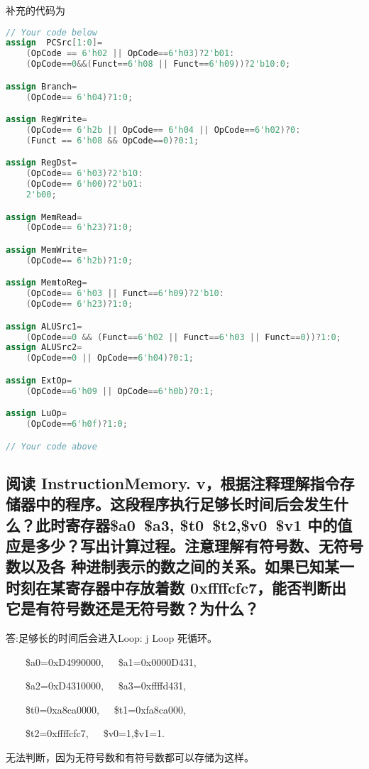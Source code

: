 \documentclass{ctexart}
\begin{document}
        补充的代码为
        	\begin{lstlisting}[language=verilog]
// Your code below
assign 	PCSrc[1:0]=
    (OpCode == 6'h02 || OpCode==6'h03)?2'b01:
    (OpCode==0&&(Funct==6'h08 || Funct==6'h09))?2'b10:0;

assign Branch=
    (OpCode== 6'h04)?1:0;

assign RegWrite=
    (OpCode== 6'h2b || OpCode== 6'h04 || OpCode==6'h02)?0:
    (Funct == 6'h08 && OpCode==0)?0:1;

assign RegDst=
    (OpCode== 6'h03)?2'b10:
    (OpCode== 6'h00)?2'b01:
    2'b00;

assign MemRead=
    (OpCode== 6'h23)?1:0;

assign MemWrite=
    (OpCode== 6'h2b)?1:0;

assign MemtoReg=
    (OpCode== 6'h03 || Funct==6'h09)?2'b10:
    (OpCode== 6'h23)?1:0;

assign ALUSrc1=
    (OpCode==0 && (Funct==6'h02 || Funct==6'h03 || Funct==0))?1:0;
assign ALUSrc2=
    (OpCode==0 || OpCode==6'h04)?0:1;

assign ExtOp=
    (OpCode==6'h09 || OpCode==6'h0b)?0:1;

assign LuOp=
    (OpCode==6'h0f)?1:0;

// Your code above
    \end{lstlisting}
        \subsection{ 阅读 InstructionMemory.   
        v，根据注释理解指令存储器中的程序。这段程序执行足够长时间后会发生什么？此时寄存器\$a0~\$a3,
        \$t0~\$t2,\$v0~\$v1 中的值应是多少？写出计算过程。注意理解有符号数、无符号数以及各
        种进制表示的数之间的关系。如果已知某一时刻在某寄存器中存放着数 0xffffcfc7，能否判断出
    它是有符号数还是无符号数？为什么？}
            答:足够长的时间后会进入Loop: j Loop 死循环。
            
            ~~~~\$a0=0xD4990000,~~~\$a1=0x0000D431,
            
            ~~~~\$a2=0xD4310000,~~~\$a3=0xffffd431,
            
            ~~~~\$t0=0xa8ca0000,~~~\$t1=0xfa8ca000,
            
            ~~~~\$t2=0xffffcfc7,~~~\$v0=1,\$v1=1.
            
            无法判断，因为无符号数和有符号数都可以存储为这样。
\end{document}
